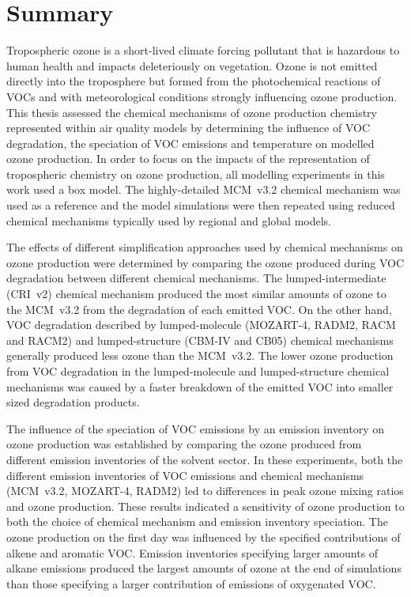 \vspace{-3mm}
\section{Summary}
\vspace{-3mm}
Tropospheric ozone is a short-lived climate forcing pollutant that is hazardous to human health and impacts deleteriously on vegetation.
Ozone is not emitted directly into the troposphere but formed from the photochemical reactions of VOCs and  with meteorological conditions strongly influencing ozone production.
This thesis assessed the chemical mechanisms of ozone production chemistry represented within air quality models by determining the influence of VOC degradation, the speciation of VOC emissions and temperature on modelled ozone production.
In order to focus on the impacts of the representation of tropospheric chemistry on ozone production, all modelling experiments in this work used a box model.
The highly-detailed MCM~v3.2 chemical mechanism was used as a reference and the model simulations were then repeated using reduced chemical mechanisms typically used by regional and global models.

The effects of different simplification approaches used by chemical mechanisms on ozone production were determined by comparing the ozone produced during VOC degradation between different chemical mechanisms.
The lumped-intermediate (CRI~v2) chemical mechanism produced the most similar amounts of ozone to the MCM~v3.2 from the degradation of each emitted VOC.
On the other hand, VOC degradation described by lumped-molecule (MOZART-4, RADM2, RACM and RACM2) and lumped-structure (CBM-IV and CB05) chemical mechanisms generally produced less ozone than the MCM~v3.2.
The lower ozone production from VOC degradation in the lumped-molecule and lumped-structure chemical mechanisms was caused by a faster breakdown of the emitted VOC into smaller sized degradation products.

The influence of the speciation of VOC emissions by an emission inventory on ozone production was established by comparing the ozone produced from different emission inventories of the solvent sector.
In these experiments, both the different emission inventories of VOC emissions and chemical mechanisms (MCM~v3.2, MOZART-4, RADM2) led to differences in peak ozone mixing ratios and ozone production.
These results indicated a sensitivity of ozone production to both the choice of chemical mechanism and emission inventory speciation.
The ozone production on the first day was influenced by the specified contributions of alkene and aromatic VOC.
Emission inventories specifying larger amounts of alkane emissions produced the largest amounts of ozone at the end of simulations than those specifying a larger contribution of emissions of oxygenated VOC.

